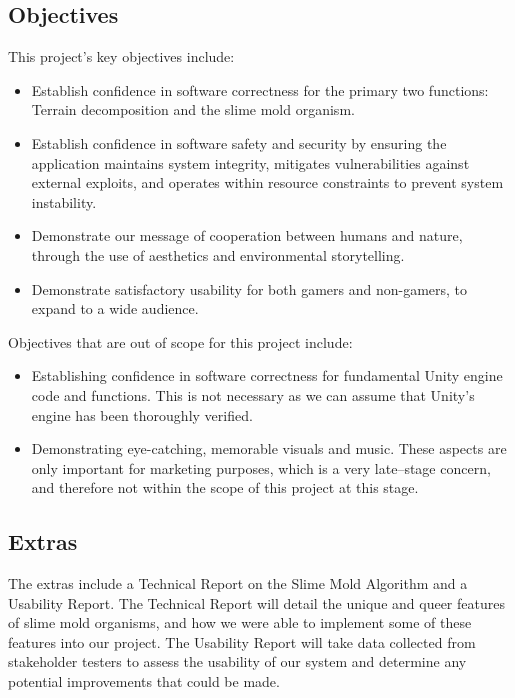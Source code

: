 \documentclass[12pt, titlepage]{article}
\begin{document}
\subsection{Objectives}

This project's key objectives include:

\begin{itemize}
\item Establish confidence in software correctness for the primary two functions: Terrain decomposition and the slime mold organism.
\item Establish confidence in software safety and security by ensuring the application maintains system integrity, mitigates vulnerabilities against external exploits, and operates within resource constraints to prevent system instability.
\item Demonstrate our message of cooperation between humans and nature, through the use of aesthetics and environmental storytelling.
\item Demonstrate satisfactory usability for both gamers and non-gamers, to expand to a wide audience.
\end{itemize}

\noindent Objectives that are out of scope for this project include:

\begin{itemize}
\item Establishing confidence in software correctness for fundamental Unity engine code and functions. This is not necessary as we can assume that Unity’s engine has been thoroughly verified.

\item Demonstrating eye-catching, memorable visuals and music. These aspects are only important for marketing purposes, which is a very late--stage concern, and therefore not within the scope of this project at this stage.
\end{itemize}

\subsection{Extras}

The extras include a Technical Report on the Slime Mold Algorithm and a Usability Report.
The Technical Report will detail the unique and queer features of slime mold organisms, and
how we were able to implement some of these features into our project.
The Usability Report will take data collected from stakeholder testers to assess the
usability of our system and determine any potential improvements that could be made.
\end{document}
